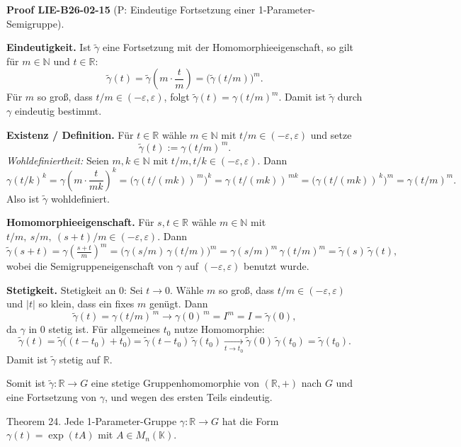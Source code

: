 \documentclass[10pt, letterpaper]{article}
\newcommand{\CustomHeading}[3]{%
  \par\medskip\noindent%
  \textbf{#1 #2} \textnormal{(#3)}.\enskip%
}
\newenvironment{PROOF}[2]{\begin{unitbox}\CustomHeading{Proof}{#1}{#2}}{\end{unitbox}}
\begin{document}
\begin{PROOF}{LIE-B26-02-15}{P: Eindeutige Fortsetzung einer 1-Parameter-Semigruppe}
\textbf{Eindeutigkeit.}
Ist $\tilde{\gamma}$ eine Fortsetzung mit der Homomorphieeigenschaft,
so gilt für $m\in\mathbb{N}$ und $t\in\mathbb{R}$:
\[
\tilde{\gamma}(t)=\tilde{\gamma}\!\left(m\cdot\frac{t}{m}\right)
=\big(\tilde{\gamma}(t/m)\big)^{m}.
\]
Für $m$ so groß, dass $t/m\in(-\varepsilon,\varepsilon)$, folgt
$\tilde{\gamma}(t)=\gamma(t/m)^{m}$. Damit ist $\tilde{\gamma}$ durch $\gamma$
eindeutig bestimmt.

\medskip
\textbf{Existenz / Definition.}
Für $t\in\mathbb{R}$ wähle $m\in\mathbb{N}$ mit $t/m\in(-\varepsilon,\varepsilon)$
und setze
\[
\tilde{\gamma}(t):=\gamma(t/m)^{\,m}.
\]
\emph{Wohldefiniertheit:}
Seien $m,k\in\mathbb{N}$ mit $t/m,t/k\in(-\varepsilon,\varepsilon)$. Dann
\[
\gamma(t/k)^{k}
=\gamma\!\left(m\cdot \frac{t}{mk}\right)^{k}
=\big(\gamma(t/(mk))^{\,m}\big)^{k}
=\gamma(t/(mk))^{\,mk}
=\big(\gamma(t/(mk))^{\,k}\big)^{m}
=\gamma(t/m)^{m}.
\]
Also ist $\tilde{\gamma}$ wohldefiniert.

\medskip
\textbf{Homomorphieeigenschaft.}
Für $s,t\in\mathbb{R}$ wähle $m\in\mathbb{N}$ mit
$t/m,\ s/m,\ (s+t)/m \in(-\varepsilon,\varepsilon)$. Dann
\[
\tilde{\gamma}(s+t)=\gamma\!\left(\tfrac{s+t}{m}\right)^{m}
=\big(\gamma(s/m)\,\gamma(t/m)\big)^{m}
=\gamma(s/m)^{m}\,\gamma(t/m)^{m}
=\tilde{\gamma}(s)\,\tilde{\gamma}(t),
\]
wobei die Semigruppeneigenschaft von $\gamma$ auf $(-\varepsilon,\varepsilon)$ benutzt wurde.

\medskip
\textbf{Stetigkeit.}
Stetigkeit an $0$: Sei $t\to 0$. Wähle $m$ so groß, dass 
$t/m\in(-\varepsilon,\varepsilon)$ und $|t|$ so klein, dass ein fixes $m$ genügt.
Dann
\[
\tilde{\gamma}(t)=\gamma(t/m)^{\,m}\to \gamma(0)^{\,m}=I^{m}=I=\tilde{\gamma}(0),
\]
da $\gamma$ in $0$ stetig ist. Für allgemeines $t_0$ nutze Homomorphie:
\[
\tilde{\gamma}(t)=\tilde{\gamma}\big((t-t_0)+t_0\big)
=\tilde{\gamma}(t-t_0)\,\tilde{\gamma}(t_0)\xrightarrow[t\to t_0]{}\tilde{\gamma}(0)\,\tilde{\gamma}(t_0)=\tilde{\gamma}(t_0).
\]
Damit ist $\tilde{\gamma}$ stetig auf $\mathbb{R}$.

\medskip
Somit ist $\tilde{\gamma}:\mathbb{R}\to G$ eine stetige Gruppenhomomorphie
von $(\mathbb{R},+)$ nach $G$ und eine Fortsetzung von $\gamma$, und wegen des ersten Teils eindeutig.
\end{PROOF}



Theorem 24. Jede 1-Parameter-Gruppe $\gamma: \mathbb{R} \rightarrow G$ hat die Form $\gamma(t)=\exp (t A)$ mit $A \in M_{n}(\mathbb{K})$.
\end{document}
